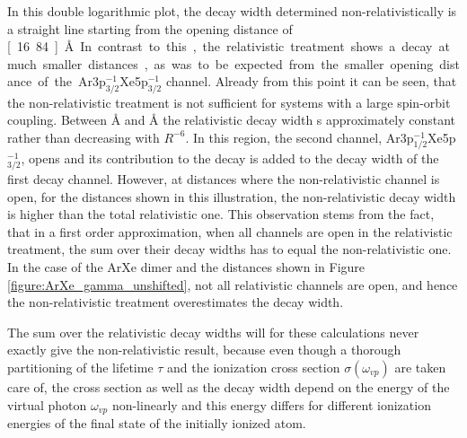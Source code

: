 In this double logarithmic plot, the decay width determined non-relativistically
is a straight line starting
from the opening distance of \unit[16.84]{\AA}.
In contrast to this, the relativistic treatment shows a decay at much smaller
distances, as was to be expected from the smaller opening distance of the
Ar3p$_{3/2}^{-1}$Xe5p$_{3/2}^{-1}$ channel. Already from this point it
can be seen, that the non-relativistic treatment is not sufficient for systems
with a large spin-orbit coupling. Between \unit[12]{\AA} and
\unit[13]{\AA} the relativistic decay width s approximately constant rather than
decreasing with $R^{-6}$.
In this region, the second channel, Ar3p$_{1/2}^{-1}$Xe5p$_{3/2}^{-1}$, opens
and its contribution to the decay is added to the decay width of the first
decay channel. However, at distances where the non-relativistic channel is open,
for the distances shown in this illustration, the non-relativistic decay width
is higher than the total relativistic one. This observation stems from the fact,
that in a first order approximation, when all channels are open in the relativistic
treatment, the sum over their decay widths has to equal the non-relativistic one.
In the case of the ArXe dimer and the distances shown in Figure
\ref{figure:ArXe_gamma_unshifted}, not all relativistic channels are open, and
hence the non-relativistic treatment overestimates the decay width.

The sum over the relativistic decay widths will for these calculations never
exactly give the non-relativistic result, because even though a thorough
partitioning of the lifetime $\tau$ and the ionization cross section
$\sigma(\omega_{vp})$ are taken care of, the cross section as well as the decay
width depend on the energy of the virtual photon $\omega_{vp}$ non-linearly and this
energy differs for different ionization energies of the final state of the
initially ionized atom.

